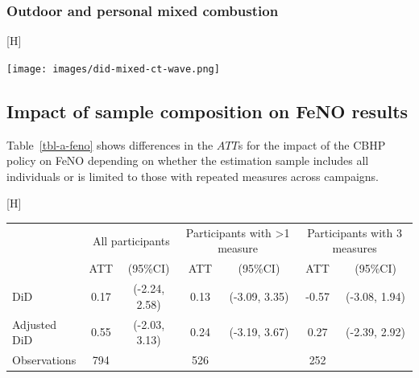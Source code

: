 \documentclass[
  letterpaper,
  DIV=11,
  numbers=noendperiod]{scrartcl}
\makeatletter
\renewenvironment{table}%
   {\renewcommand\familydefault\sfdefault
    \@float{table}}
   {\end@float}
\renewenvironment{figure}%
   {\renewcommand\familydefault\sfdefault
    \@float{figure}}
   {\end@float}
\makeatother
\begin{document}
\newpage

\hypertarget{outdoor-and-personal-mixed-combustion}{%
\subsubsection{Outdoor and personal mixed
combustion}\label{outdoor-and-personal-mixed-combustion}}

\begin{figure}[H]

{\centering \texttt{[image: images/did-mixed-ct-wave.png]}

}

\caption{\label{fig-afig-mixed-ct}Adjusted and unadjusted treatment
effect for outdoor and personal exposure (µg/m\textsuperscript{3}) to
the mixed combustion source by treatment year.}

\end{figure}

\newpage

\hypertarget{impact-of-sample-composition-on-feno-results}{%
\subsection{Impact of sample composition on FeNO
results}\label{impact-of-sample-composition-on-feno-results}}

Table~\ref{tbl-a-feno} shows differences in the \(ATT\)s for the impact
of the CBHP policy on FeNO depending on whether the estimation sample
includes all individuals or is limited to those with repeated measures
across campaigns.

\hypertarget{tbl-a-feno}{}
\begin{table}[H]
\caption{\label{tbl-a-feno}Effects of the CBHP policy on FeNO (ppb) based on the number of
individuals with repeated measurements. }\tabularnewline

\centering
\begin{tabular}{lcccccc}
\toprule
\multicolumn{1}{c}{ } & \multicolumn{2}{c}{All participants} & \multicolumn{2}{c}{Participants with >1 measure} & \multicolumn{2}{c}{Participants with 3 measures} \\
\cmidrule(l{3pt}r{3pt}){2-3} \cmidrule(l{3pt}r{3pt}){4-5} \cmidrule(l{3pt}r{3pt}){6-7}
 & ATT & (95\%CI) & ATT & (95\%CI) & ATT & (95\%CI)\\
\midrule
DiD & 0.17 & (-2.24, 2.58) & 0.13 & (-3.09, 3.35) & -0.57 & (-3.08, 1.94)\\
Adjusted DiD & 0.55 & (-2.03, 3.13) & 0.24 & (-3.19, 3.67) & 0.27 & (-2.39, 2.92)\\
Observations & 794 &  & 526 &  & 252 & \\
\bottomrule
\end{tabular}
\end{table}
\end{document}

